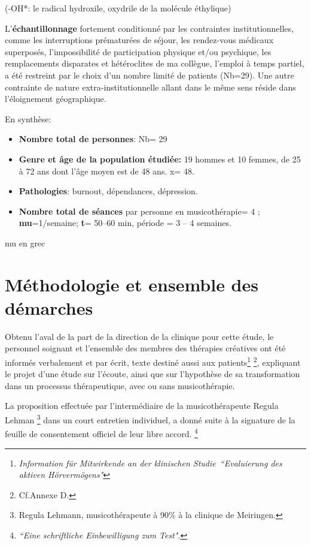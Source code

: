 (-OH*:  le radical hydroxile, oxydrile de la molécule éthylique)




L'\textbf{échantillonnage} fortement conditionné par les contraintes
institutionnelles, comme les interruptions prématurées de séjour, les rendez-vous
 médicaux superposés, l'impossibilité de participation physique et/ou
 psychique, les remplacements disparates et hétéroclites de ma
 collègue, l'emploi à
 temps partiel, a été restreint  par le choix d'un nombre limité de
 patients (Nb=29).
Une autre contrainte de nature extra-institutionnelle allant dans le
même sens réside dans l'éloignement géographique.

En synthèse:
 \begin{itemize}
 
 \item \textbf{Nombre total de personnes}: Nb= 29 
\item\textbf{Genre et âge de la population étudiée:}  19 hommes et 10 femmes, de 25 à 72
  ans dont l'âge moyen est de 48 ans. x= 48.
 \item\textbf{Pathologies}: burnout, dépendances, dépression.
 \item \textbf{Nombre total de séances} par personne en
   musicothérapie= 4 ;   \textbf{mu}=1/semaine;  
 \textbf{t}= 50--60 min, période = 3 -- 4 semaines.
\end{itemize}




 mu en grec
\section{Méthodologie et  ensemble des démarches}






Obtenu l'aval de la part de la direction de la
clinique pour cette étude,  le personnel soignant et l'ensemble des membres des
thérapies créatives ont été informés verbalement et par écrit, texte
destiné aussi aux
patients\footnote{ \emph{Information für Mitwirkende an der klinischen
  Studie\  ``Evaluierung des aktiven Hörvermögens" }
}  \footnote{Cf.Annexe D.}, expliquant le projet d'une étude sur l'écoute, ainsi que
sur l'hypothèse de sa transformation dans un processus thérapeutique, 
avec ou sans musicothérapie.

La proposition effectuée par l'intermédiaire de la musicothérapeute  Regula Lehman \footnote{Regula
  Lehmann, musicothérapeute  à 90\%  à la clinique de Meiringen.} dans un
court entretien individuel, a donné suite à  la signature de la 
feuille de consentement  officiel de leur libre 
accord. \footnote{\emph{``Eine schriftliche Einbewilligung zum
    Test"}.}


